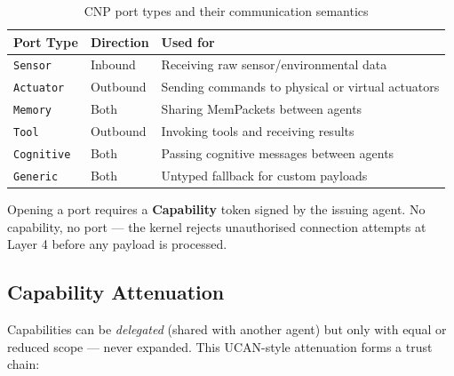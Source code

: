 \begin{table}[H]
\centering
\renewcommand{\arraystretch}{1.4}
\begin{tabularx}{\textwidth}{@{}llX@{}}
\toprule
\textbf{Port Type} & \textbf{Direction} & \textbf{Used for} \\
\midrule
\texttt{Sensor}    & Inbound  & Receiving raw sensor/environmental data \\
\texttt{Actuator}  & Outbound & Sending commands to physical or virtual actuators \\
\texttt{Memory}    & Both     & Sharing MemPackets between agents \\
\texttt{Tool}      & Outbound & Invoking tools and receiving results \\
\texttt{Cognitive} & Both     & Passing cognitive messages between agents \\
\texttt{Generic}   & Both     & Untyped fallback for custom payloads \\
\bottomrule
\end{tabularx}
\caption{CNP port types and their communication semantics}
\end{table}

Opening a port requires a \textbf{Capability} token signed by the issuing agent.
No capability, no port — the kernel rejects unauthorised connection attempts at
Layer 4 before any payload is processed.

\subsection{Capability Attenuation}

Capabilities can be \emph{delegated} (shared with another agent) but only with
equal or reduced scope — never expanded. This UCAN-style attenuation forms a
trust chain:

